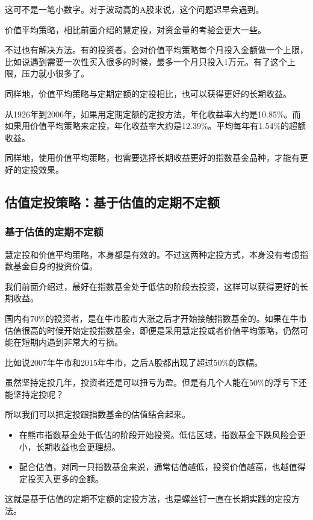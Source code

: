 这可不是一笔小数字。对于波动高的A股来说，这个问题迟早会遇到。

价值平均策略，相比前面介绍的慧定投，对资金量的考验会更大一些。

不过也有解决方法。有的投资者，会对价值平均策略每个月投入金额做一个上限，比如说遇到需要一次性买入很多的时候，最多一个月只投入1万元。有了这个上限，压力就小很多了。

同样地，价值平均策略与定期定额的定投相比，也可以获得更好的长期收益。

从1926年到2006年，如果用定期定额的定投方法，年化收益率大约是10.85\%。而如果用价值平均策略来定投，年化收益率大约是12.39\%。平均每年有1.54\%的超额收益。

同样地，使用价值平均策略，也需要选择长期收益更好的指数基金品种，才能有更好的定投效果。

\subsection{估值定投策略：基于估值的定期不定额}
\subsubsection{基于估值的定期不定额}

慧定投和价值平均策略，本身都是有效的。不过这两种定投方式，本身没有考虑指数基金自身的投资价值。

我们前面介绍过，最好在指数基金处于低估的阶段去投资，这样可以获得更好的长期收益。

国内有70\%的投资者，是在牛市股市大涨之后才开始接触指数基金的。如果在牛市估值很高的时候开始定投指数基金，即便是采用慧定投或者价值平均策略，仍然可能在短期内遇到非常大的亏损。

比如说2007年牛市和2015年牛市，之后A股都出现了超过50\%的跌幅。

虽然坚持定投几年，投资者还是可以扭亏为盈。但是有几个人能在50\%的浮亏下还能坚持定投呢？

所以我们可以把定投跟指数基金的估值结合起来。

\begin{itemize}
\item 在熊市指数基金处于低估的阶段开始投资。低估区域，指数基金下跌风险会更小，长期收益也会更理想。
\item 配合估值，对同一只指数基金来说，通常估值越低，投资价值越高，也越值得定投买入更多的金额。
\end{itemize}

这就是基于估值的定期不定额的定投方法，也是螺丝钉一直在长期实践的定投方法。

